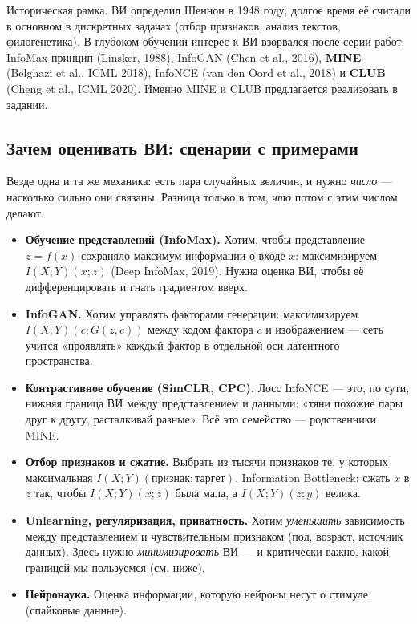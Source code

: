 \documentclass[11pt]{article}
\newcommand{\MI}{I(X;Y)}
\begin{document}
Историческая рамка. ВИ определил Шеннон в 1948 году; долгое время её считали в основном в дискретных задачах (отбор признаков, анализ текстов, филогенетика). В глубоком обучении интерес к ВИ взорвался после серии работ: InfoMax-принцип (Linsker, 1988), InfoGAN (Chen et al., 2016), \textbf{MINE} (Belghazi et al., ICML 2018), InfoNCE (van den Oord et al., 2018) и \textbf{CLUB} (Cheng et al., ICML 2020). Именно MINE и CLUB предлагается реализовать в задании.

\subsection{Зачем оценивать ВИ: сценарии с примерами}

Везде одна и та же механика: есть пара случайных величин, и нужно \emph{число} — насколько сильно они связаны. Разница только в том, \emph{что} потом с этим числом делают.

\begin{itemize}
\item \textbf{Обучение представлений (InfoMax).} Хотим, чтобы представление $z=f(x)$ сохраняло максимум информации о входе $x$: максимизируем $\MI(x;z)$ (Deep InfoMax, 2019). Нужна оценка ВИ, чтобы её дифференцировать и гнать градиентом вверх.
\item \textbf{InfoGAN.} Хотим управлять факторами генерации: максимизируем $\MI(c; G(z,c))$ между кодом фактора $c$ и изображением — сеть учится «проявлять» каждый фактор в отдельной оси латентного пространства.
\item \textbf{Контрастивное обучение (SimCLR, CPC).} Лосс InfoNCE — это, по сути, нижняя граница ВИ между представлением и данными: «тяни похожие пары друг к другу, расталкивай разные». Всё это семейство — родственники MINE.
\item \textbf{Отбор признаков и сжатие.} Выбрать из тысячи признаков те, у которых максимальная $\MI(\text{признак}; \text{таргет})$. Information Bottleneck: сжать $x$ в $z$ так, чтобы $\MI(x;z)$ была мала, а $\MI(z;y)$ велика.
\item \textbf{Unlearning, регуляризация, приватность.} Хотим \emph{уменьшить} зависимость между представлением и чувствительным признаком (пол, возраст, источник данных). Здесь нужно \emph{минимизировать} ВИ — и критически важно, какой границей мы пользуемся (см. ниже).
\item \textbf{Нейронаука.} Оценка информации, которую нейроны несут о стимуле (спайковые данные).
\end{itemize}
\end{document}
